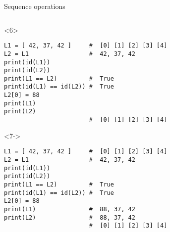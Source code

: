 \begin{frame}[fragile]{Sequence operations}
\begin{center}
\begin{columns}[onlytextwidth]
\begin{column}{\textwidth}
      \begin{onlyenv}<6>
        \begin{lstlisting}[style=python,morekeywords={for, in, range, list}]
L1 = [ 42, 37, 42 ]     #  [0] [1] [2] [3] [4]
L2 = L1                 #  42, 37, 42
print(id(L1))
print(id(L2))
print(L1 == L2)         #  True
print(id(L1) == id(L2)) #  True
L2[0] = 88
print(L1)
print(L2)
                        #  [0] [1] [2] [3] [4] \end{lstlisting}
      \end{onlyenv}

      \begin{onlyenv}<7->
        \begin{lstlisting}[style=python,morekeywords={for, in, range, list}]
L1 = [ 42, 37, 42 ]     #  [0] [1] [2] [3] [4]
L2 = L1                 #  42, 37, 42
print(id(L1))
print(id(L2))
print(L1 == L2)         #  True
print(id(L1) == id(L2)) #  True
L2[0] = 88
print(L1)               #  88, 37, 42
print(L2)               #  88, 37, 42
                        #  [0] [1] [2] [3] [4] \end{lstlisting}
      \end{onlyenv}

    \end{column}
  \end{columns}

  \end{center}

\end{frame}


